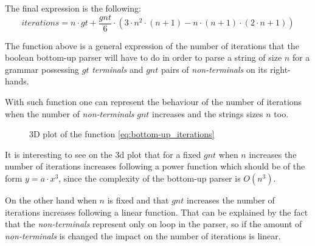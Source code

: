 The final expression is the following:
\begin{equation} \label{eq:bottom-up_iterations}
    iterations = n \cdot gt + \dfrac{gnt}{6} \cdot (3 \cdot n^2 \cdot (n + 1) - n \cdot (n + 1) \cdot (2 \cdot n + 1))
\end{equation}

The function above is a general expression of the number of iterations that the boolean bottom-up parser will have to do in order to parse a string of size $n$ for a grammar possessing $gt$ \textit{terminals} and $gnt$ pairs of \textit{non-terminals} on its right-hands.

With such function one can represent the behaviour of the number of iterations when the number of \textit{non-terminals} $gnt$ increases and the strings sizes $n$ too.

\FloatBarrier
\begin{figure}[h]
\caption{3D plot of the function \ref{eq:bottom-up_iterations}}
\end{figure}
\FloatBarrier

It is interesting to see on the 3d plot that for a fixed $gnt$ when $n$ increases the number of iterations increases following a power function which should be of the form $y = a \cdot x^3$, since the complexity of the bottom-up parser is $O(n^3)$.

On the other hand when $n$ is fixed and that $gnt$ increases the number of iterations increases following a linear function.
That can be explained by the fact that the \textit{non-terminals} represent only on loop in the parser, so if the amount of \textit{non-terminals} is changed the impact on the number of iterations is linear.

